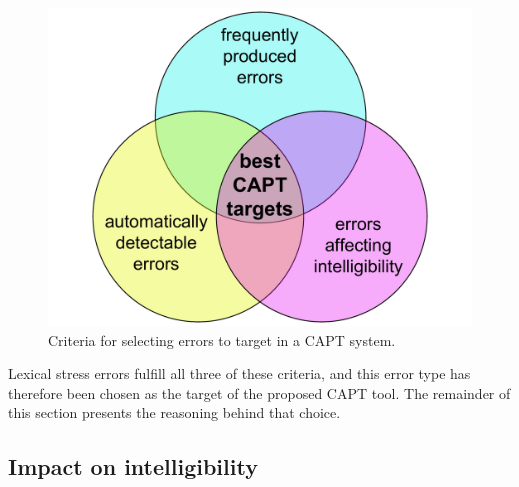 		\begin{figure}[htb]
			\centering
			\includegraphics[width=.7\textwidth]{img/error-venn}
			\caption{Criteria for selecting errors to target in a CAPT system.}
			\label{fig:errors}
		\end{figure}

	Lexical stress errors 
	fulfill all three of these criteria, and this error type has therefore been chosen as the target of the proposed CAPT tool. The remainder of this section 
	presents the reasoning behind 
	that choice. 
%	
%	
%
%	 

%
%	
%
		\subsection{Impact on intelligibility}
		\label{sec:targeting:intelligibility}
		

